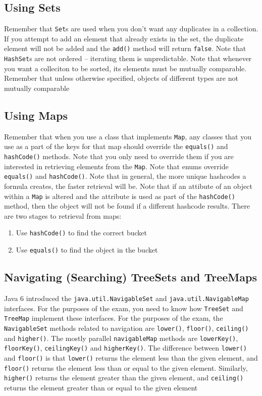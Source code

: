 \subsection{Using Sets}
Remember that \verb#Set#s are used when you don't want any duplicates in a 
collection. If you attempt to add an element that already exists in the set, 
the duplicate element will not be added and the \verb#add()# method will return 
\verb#false#. Note that \verb#HashSet#s are not ordered -- iterating them is 
unpredictable. Note that whenever you want a colleciton to be sorted, its 
elements must be mutually comparable. Remember that unless otherwise specified, 
objects of different types are not mutually comparable

\subsection{Using Maps}
Remember that when you use a class that implements \verb#Map#, any classes that 
you use as a part of the keys for that map should override the \verb#equals()# 
and \verb#hashCode()# methods. Note that you only need to override them if you 
are interested in retrieving elements from the \verb#Map#. Note that enums 
override \verb#equals()# and \verb#hashCode()#. Note that in general, the more 
unique hashcodes a formula creates, the faster retrieval will be. Note that if 
an attibute of an object within a \verb#Map# is altered and the attribute is 
used as part of the \verb#hashCode()# method, then the object will not be found 
if a different hashcode results. There are two stages to retrieval from maps:
\begin{enumerate}
    \item Use \verb#hashCode()# to find the correct bucket
    \item Use \verb#equals()# to find the object in the bucket
\end{enumerate}

\subsection{Navigating (Searching) TreeSets and TreeMaps}
Java 6 introduced the \verb#java.util.NavigableSet# and 
\verb#java.util.NavigableMap# interfaces. For the purposes of the exam, you 
need to know how \verb#TreeSet# and \verb#TreeMap# implement these interfaces.  
For the purposes of the exam, the \verb#NavigableSet# methods related to 
navigation are \verb#lower()#, \verb#floor()#, \verb#ceiling()# and 
\verb#higher()#. The mostly parallel \verb#navigableMap# methods are 
\verb#lowerKey()#, \verb#floorKey()#, \verb#ceilingKey()# and 
\verb#higherKey()#. The difference between \verb#lower()# and \verb#floor()# is 
that \verb#lower()# returns the element less than the given element, and 
\verb#floor()# returns the element less than or equal to the given element.  
Similarly, \verb#higher()# returns the element greater than the given element, 
and \verb#ceiling()# returns the element greater than or equal to the given 
element

